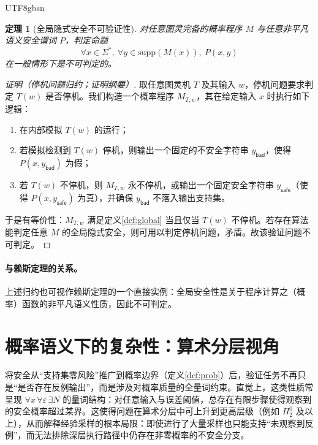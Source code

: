 \documentclass[letterpaper,twocolumn,10pt]{article}
\newtheorem{theorem}{定理}
\newcommand{\Strings}{\Sigma^{*}}
\newcommand{\supp}{\mathrm{supp}}
\begin{document}
\begin{CJK}{UTF8}{gbsn}
\begin{theorem}[全局隐式安全不可验证性]\label{thm:undecidable}
对任意图灵完备的概率程序 $M$ 与任意非平凡语义安全谓词 $P$，判定命题
\[
\forall x\in\Strings,\ \forall y\in\supp(M(x)),\ P(x,y)
\]
在一般情形下是不可判定的。
\end{theorem}

\begin{proof}[证明（停机问题归约；证明纲要）]
取任意图灵机 $T$ 及其输入 $w$，停机问题要求判定 $T(w)$ 是否停机。我们构造一个概率程序 $M_{T,w}$，其在给定输入 $x$ 时执行如下逻辑：
\begin{enumerate}[leftmargin=*,itemsep=0.2em]
  \item 在内部模拟 $T(w)$ 的运行；
  \item 若模拟检测到 $T(w)$ 停机，则输出一个固定的不安全字符串 $y_{\mathsf{bad}}$，使得 $P(x,y_{\mathsf{bad}})$ 为假；
  \item 若 $T(w)$ 不停机，则 $M_{T,w}$ 永不停机，或输出一个固定安全字符串 $y_{\mathsf{safe}}$（使得 $P(x,y_{\mathsf{safe}})$ 为真），并确保 $y_{\mathsf{bad}}$ 不落入输出支持集。
\end{enumerate}
于是有等价性：$M_{T,w}$ 满足定义\ref{def:global} 当且仅当 $T(w)$ 不停机。若存在算法能判定任意 $M$ 的全局隐式安全，则可用以判定停机问题，矛盾。故该验证问题不可判定。
\end{proof}

\paragraph{与赖斯定理的关系。}
上述归约也可视作赖斯定理的一个直接实例：全局安全性是关于程序计算之（概率）函数的非平凡语义性质，因此不可判定。

\section{概率语义下的复杂性：算术分层视角}
将安全从“支持集零风险”推广到概率边界（定义\ref{def:prob}）后，验证任务不再只是“是否存在反例输出”，而是涉及对概率质量的全量词约束。直觉上，这类性质常呈现 $\forall x\,\forall \varepsilon\,\exists N$ 的量词结构：对任意输入与误差阈值，总存在有限步骤使得观察到的安全概率超过某界。这使得问题在算术分层中可上升到更高层级（例如 $\Pi^0_2$ 及以上），从而解释经验采样的根本局限：即使进行了大量采样也只能支持“未观察到反例”，而无法排除深层执行路径中仍存在非零概率的不安全分支。


\end{CJK}
\end{document}
